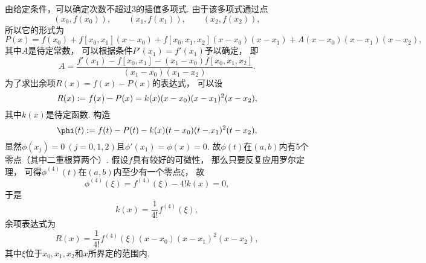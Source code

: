 由给定条件，可以确定次数不超过3的插值多项式.
由于该多项式通过点\begin{equation*}
	(x_0,f(x_0)),
	\qquad
	(x_1,f(x_1)),
	\qquad
	(x_2,f(x_2)),
\end{equation*}
所以它的形式为\begin{equation*}
	P(x)
	= f(x_0)
	+ f[x_0,x_1] (x-x_0)
	+ f[x_0,x_1,x_2] (x-x_0)(x-x_1)
	+ A (x-x_0)(x-x_1)(x-x_2),
\end{equation*}
其中\(A\)是待定常数，
可以根据条件\(P'(x_1) = f'(x_1)\)予以确定，
即\begin{equation*}
	A = \frac{
		f'(x_1) - f[x_0,x_1] - (x_1-x_0) f[x_0,x_1,x_2]
	}{
		(x_1-x_0)(x_1-x_2)
	}.
\end{equation*}
为了求出余项\(R(x) = f(x) - P(x)\)的表达式，
可以设\begin{equation*}
	R(x)
	:= f(x) - P(x)
	= k(x) (x-x_0) (x-x_1)^2 (x-x_2),
\end{equation*}
其中\(k(x)\)是待定函数.
构造\begin{equation*}
	\phi(t)
	\defeq
	f(t) - P(t) - k(x) (t-x_0) (t-x_1)^2 (t-x_2),
\end{equation*}
显然\(\phi(x_j) = 0\ (j=0,1,2)\)且\(\phi'(x_1) = \phi(x) = 0\).
故\(\phi(t)\)在\((a,b)\)内有5个零点（其中二重根算两个）.
假设\(f\)具有较好的可微性，
那么只要反复应用罗尔定理，
可得\(\phi^{(4)}(t)\)在\((a,b)\)内至少有一个零点\(\xi\)，
故\begin{equation*}
	\phi^{(4)}(\xi) = f^{(4)}(\xi) - 4! k(x) = 0,
\end{equation*}
于是\begin{equation*}
	k(x) = \frac1{4!} f^{(4)}(\xi),
\end{equation*}
余项表达式为\begin{equation*}
	R(x) = \frac1{4!} f^{(4)}(\xi) (x-x_0) (x-x_1)^2 (x-x_2),
\end{equation*}
其中\(\xi\)位于\(x_0,x_1,x_2\)和\(x\)所界定的范围内.

